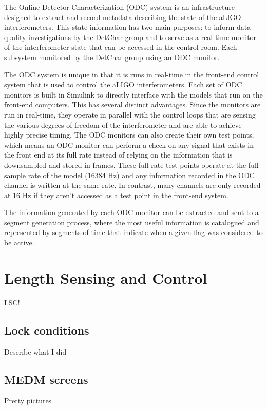The Online Detector Characterization (ODC) system is an infrastructure designed to extract and record metadata describing the state of the aLIGO interferometers. This state information has two main purposes: to inform data quality investigations by the DetChar group and to serve as a real-time monitor of the interferometer state that can be accessed in the control room. Each subsystem monitored by the DetChar group using an ODC monitor.

The ODC system is unique in that it is runs in real-time in the front-end control system that is used to control the aLIGO interferometers. Each set of ODC monitors is built in Simulink to directly interface with the models that run on the front-end computers. This has several distinct advantages. 
Since the monitors are run in real-time, they operate in parallel with the control loops that are sensing the various degrees of freedom of the interferometer and are able to achieve highly precise timing. The ODC monitors can also create their own test points, which means an ODC monitor can perform a check on any signal that exists in the front end at its full rate instead of relying on the information that is downsampled and stored in frames. 
These full rate test points operate at the full sample rate of the model (16384 Hz) and any information recorded in the ODC channel is written at the same rate. In contrast, many channels are only recorded at 16 Hz if they aren't accessed as a test point in the front-end system. 

The information generated by each ODC monitor can be extracted and sent to a segment generation process, where the most useful information is catalogued and represented by segments of time that indicate when a given flag was considered to be active.  


\section{Length Sensing and Control}
LSC!

\subsection{Lock conditions}
Describe what I did

\subsection{MEDM screens}
Pretty pictures

